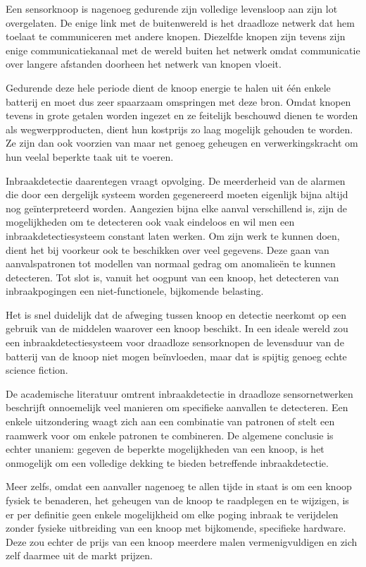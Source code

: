 \documentclass[DIV=calc,paper=a4,fontsize=11pt,twocolumn,draft]{scrartcl}
\begin{document}
Een sensorknoop is nagenoeg gedurende zijn volledige levensloop aan zijn lot
overgelaten. De enige link met de buitenwereld is het draadloze netwerk dat hem
toelaat te communiceren met andere knopen. Diezelfde knopen zijn tevens zijn
enige communicatiekanaal met de wereld buiten het netwerk omdat communicatie
over langere afstanden doorheen het netwerk van knopen vloeit.

Gedurende deze hele periode dient de knoop energie te halen uit \'e\'en enkele
batterij en moet dus zeer spaarzaam omspringen met deze bron. Omdat knopen
tevens in grote getalen worden ingezet en ze feitelijk beschouwd dienen te
worden als wegwerpproducten, dient hun kostprijs zo laag mogelijk gehouden te
worden. Ze zijn dan ook voorzien van maar net genoeg geheugen en
verwerkingskracht om hun veelal beperkte taak uit te voeren.

Inbraakdetectie daarentegen vraagt opvolging. De meerderheid van de alarmen die
door een dergelijk systeem worden gegenereerd moeten eigenlijk bijna altijd nog
ge\"interpreteerd worden. Aangezien bijna elke aanval verschillend is, zijn de
mogelijkheden om te detecteren ook vaak eindeloos en wil men een
inbraakdetectiesysteem constant laten werken. Om zijn werk te kunnen doen,
dient het bij voorkeur ook te beschikken over veel gegevens. Deze gaan van
aanvalspatronen tot modellen van normaal gedrag om anomalie\"en te kunnen
detecteren. Tot slot is, vanuit het oogpunt van een knoop, het detecteren van
inbraakpogingen een niet-functionele, bijkomende belasting.

Het is snel duidelijk dat de afweging tussen knoop en detectie neerkomt op een
gebruik van de middelen waarover een knoop beschikt. In een ideale wereld zou
een inbraakdetectiesysteem voor draadloze sensorknopen de levensduur van de
batterij van de knoop niet mogen be\"invloeden, maar dat is spijtig genoeg
echte science fiction.

De academische literatuur omtrent inbraakdetectie in draadloze sensornetwerken
beschrijft onnoemelijk veel manieren om specifieke aanvallen te detecteren. Een
enkele uitzondering waagt zich aan een combinatie van patronen of stelt een
raamwerk voor om enkele patronen te combineren. De algemene conclusie is echter
unaniem: gegeven de beperkte mogelijkheden van een knoop, is het onmogelijk om
een volledige dekking te bieden betreffende inbraakdetectie.

Meer zelfs, omdat een aanvaller nagenoeg te allen tijde in staat is om een
knoop fysiek te benaderen, het geheugen van de knoop te raadplegen en te
wijzigen, is er per definitie geen enkele mogelijkheid om elke poging inbraak
te verijdelen zonder fysieke uitbreiding van een knoop met bijkomende,
specifieke hardware. Deze zou echter de prijs van een knoop meerdere malen
vermenigvuldigen en zich zelf daarmee uit de markt prijzen.
\end{document}
